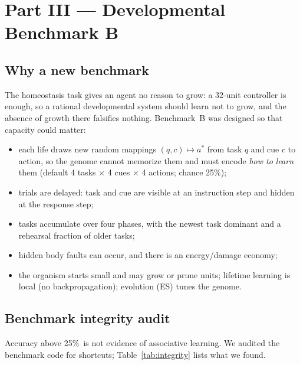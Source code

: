 \documentclass[11pt]{article}
\theoremstyle{remark}
\newcommand{\pct}{\%}
\begin{document}
\section{Part III --- Developmental Benchmark B}
\label{sec:partIII}

\subsection{Why a new benchmark}
The homeostasis task gives an agent no reason to grow: a 32-unit controller is enough, so a rational developmental
system should learn not to grow, and the absence of growth there falsifies nothing. Benchmark~B was designed so
that capacity could matter:
\begin{itemize}
  \item each life draws new random mappings $(q,c)\mapsto a^*$ from task $q$ and cue $c$ to action, so the genome
        cannot memorize them and must encode \emph{how to learn} them (default 4 tasks $\times$ 4 cues $\times$
        4 actions; chance 25\pct);
  \item trials are delayed: task and cue are visible at an instruction step and hidden at the response step;
  \item tasks accumulate over four phases, with the newest task dominant and a rehearsal fraction of older tasks;
  \item hidden body faults can occur, and there is an energy/damage economy;
  \item the organism starts small and may grow or prune units; lifetime learning is local (no backpropagation);
        evolution (ES) tunes the genome.
\end{itemize}

\subsection{Benchmark integrity audit}
\label{sec:integrity}
Accuracy above 25\pct\ is not evidence of associative learning. We audited the benchmark code for shortcuts;
Table~\ref{tab:integrity} lists what we found.
\end{document}
